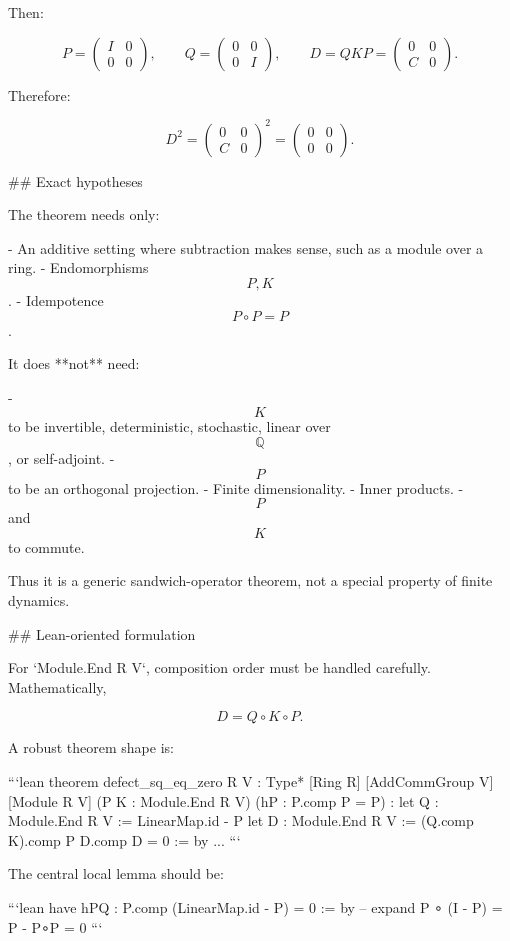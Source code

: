Then:

$$
P=
\begin{pmatrix}
I&0\\
0&0
\end{pmatrix},
\qquad
Q=
\begin{pmatrix}
0&0\\
0&I
\end{pmatrix},
\qquad
D=QKP=
\begin{pmatrix}
0&0\\
C&0
\end{pmatrix}.
$$

Therefore:

$$
D^2=
\begin{pmatrix}
0&0\\
C&0
\end{pmatrix}^2
=
\begin{pmatrix}
0&0\\
0&0
\end{pmatrix}.
$$

## Exact hypotheses

The theorem needs only:

- An additive setting where subtraction makes sense, such as a module over a ring.
- Endomorphisms $$P,K$$.
- Idempotence $$P\circ P=P$$.

It does **not** need:

- $$K$$ to be invertible, deterministic, stochastic, linear over $$\mathbb Q$$, or self-adjoint.
- $$P$$ to be an orthogonal projection.
- Finite dimensionality.
- Inner products.
- $$P$$ and $$K$$ to commute.

Thus it is a generic sandwich-operator theorem, not a special property of finite dynamics.

## Lean-oriented formulation

For `Module.End R V`, composition order must be handled carefully. Mathematically,

$$
D=Q\circ K\circ P.
$$

A robust theorem shape is:

```lean
theorem defect_sq_eq_zero
    {R V : Type*}
    [Ring R] [AddCommGroup V] [Module R V]
    (P K : Module.End R V)
    (hP : P.comp P = P) :
    let Q : Module.End R V := LinearMap.id - P
    let D : Module.End R V := (Q.comp K).comp P
    D.comp D = 0 := by
  ...
```

The central local lemma should be:

```lean
have hPQ : P.comp (LinearMap.id - P) = 0 := by
  -- expand P ∘ (I - P) = P - P∘P = 0
```

